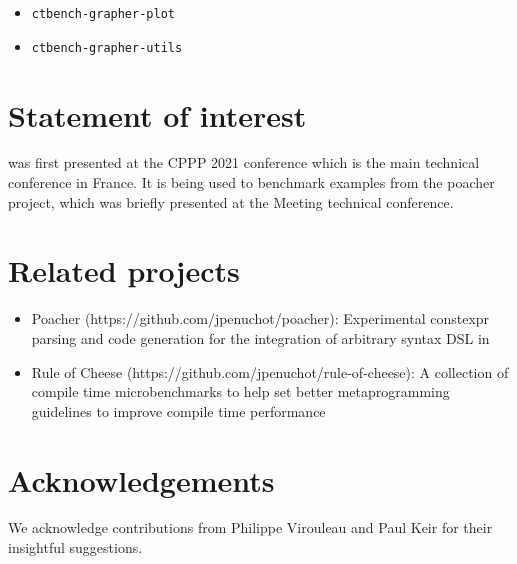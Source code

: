 \documentclass[../../main.tex]{subfiles}
\begin{document}
\begin{itemize}
\item \lstinline{ctbench-grapher-plot} %
\item \lstinline{ctbench-grapher-utils} %
\end{itemize}

\section{Statement of interest} %

\ctbench was first presented at the CPPP 2021 conference\cite{ctbench-cppp21}
which is the main \cpp technical conference in France. It is being used to
benchmark examples from the poacher\cite{poacher} project, which was briefly
presented at the Meeting \cite{meetingcpp22} technical conference.

\section{Related projects} %

\begin{itemize}

\item Poacher (https://github.com/jpenuchot/poacher): Experimental constexpr
      parsing and code generation for the integration of arbitrary syntax DSL in

\item Rule of Cheese (https://github.com/jpenuchot/rule-of-cheese):
      A collection of compile time microbenchmarks to help set better
      \cpp metaprogramming guidelines to improve compile time performance
\end{itemize}

\section{Acknowledgements}

We acknowledge contributions from Philippe Virouleau and Paul Keir for their
insightful suggestions.
\end{document}
